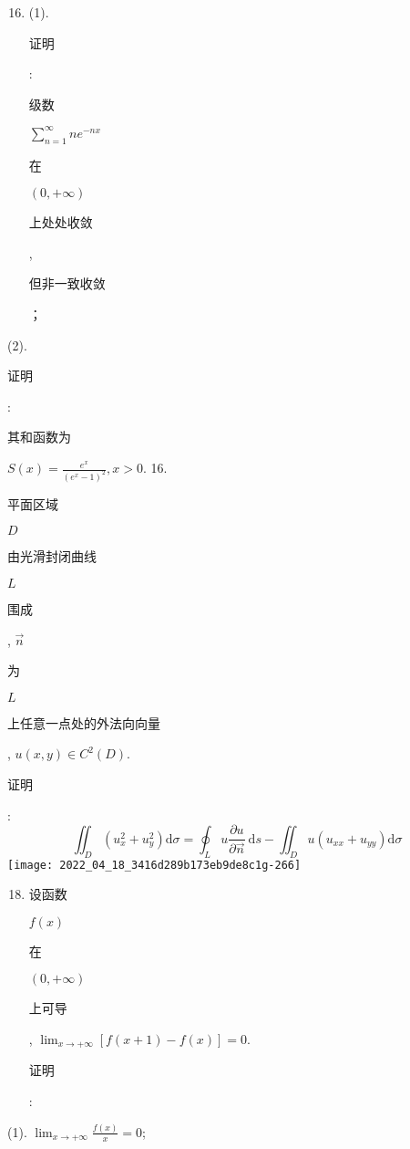 \documentclass[10pt]{article}
\begin{document}
\begin{enumerate}
  \setcounter{enumi}{15}
  \item (1). \begin{CJK}{UTF8}{mj}证明\end{CJK}: \begin{CJK}{UTF8}{mj}级数\end{CJK} $\sum_{n=1}^{\infty} n e^{-n x}$ \begin{CJK}{UTF8}{mj}在\end{CJK} $(0,+\infty)$ \begin{CJK}{UTF8}{mj}上处处收敛\end{CJK}, \begin{CJK}{UTF8}{mj}但非一致收敛\end{CJK}；
\end{enumerate}
(2). \begin{CJK}{UTF8}{mj}证明\end{CJK}: \begin{CJK}{UTF8}{mj}其和函数为\end{CJK} $S(x)=\frac{e^{x}}{\left(e^{x}-1\right)^{2}}, x>0$. 16. \begin{CJK}{UTF8}{mj}平面区域\end{CJK} $D$ \begin{CJK}{UTF8}{mj}由光滑封闭曲线\end{CJK} $L$ \begin{CJK}{UTF8}{mj}围成\end{CJK}, $\vec{n}$ \begin{CJK}{UTF8}{mj}为\end{CJK} $L$ \begin{CJK}{UTF8}{mj}上任意一点处的外法向向量\end{CJK}, $u(x, y) \in C^{2}(D)$. \begin{CJK}{UTF8}{mj}证明\end{CJK}:
$$
\iint_{D}\left(u_{x}^{2}+u_{y}^{2}\right) \mathrm{d} \sigma=\oint_{L} u \frac{\partial u}{\partial \vec{n}} \mathrm{~d} s-\iint_{D} u\left(u_{x x}+u_{y y}\right) \mathrm{d} \sigma
$$
\texttt{[image: 2022\_04\_18\_3416d289b173eb9de8c1g-266]}

\begin{enumerate}
  \setcounter{enumi}{17}
  \item \begin{CJK}{UTF8}{mj}设函数\end{CJK} $f(x)$ \begin{CJK}{UTF8}{mj}在\end{CJK} $(0,+\infty)$ \begin{CJK}{UTF8}{mj}上可导\end{CJK}, $\lim _{x \rightarrow+\infty}[f(x+1)-f(x)]=0$. \begin{CJK}{UTF8}{mj}证明\end{CJK}:
\end{enumerate}
(1). $\lim _{x \rightarrow+\infty} \frac{f(x)}{x}=0$;
\end{document}
